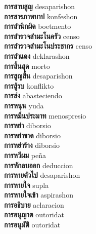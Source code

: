 \textbf{ การสาบสูญ  } desaparishon \\
\textbf{ การสารภาพบาป  } konfeshon \\
\textbf{ การสำนึกผิด  } boetmento \\
\textbf{ การสำรวจสำมะโนครัว  } censo \\
\textbf{ การสำรวจสำมะโนประชากร  } censo \\
\textbf{ การสำแดง  } deklarashon \\
\textbf{ การสิ้นสุด  } morto \\
\textbf{ การสูญสิ้น  } desaparishon \\
\textbf{ การสู้รบ  } konflikto \\
\textbf{ การส่ง  } abasteciendo \\
\textbf{ การหนุน  } yuda \\
\textbf{ การหมิ่นประมาท  } menospresio \\
\textbf{ การหย่า  } diborsio \\
\textbf{ การหย่าขาด  } diborsio \\
\textbf{ การหย่าร้าง  } diborsio \\
\textbf{ การหวีผม  } peña \\
\textbf{ การหักลบออก  } deduccion \\
\textbf{ การหายตัวไป  } desaparishon \\
\textbf{ การหายใจ  } supla \\
\textbf{ การหายใจเข้า  } aspirashon \\
\textbf{ การอธิบาย  } aclaracion \\
\textbf{ การอนุญาต  } outoridat \\
\textbf{ การอนุมัติ  } outoridat \\
